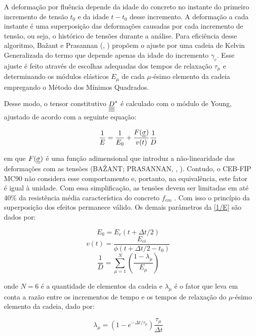 A deformação por fluência depende da idade do concreto no instante do primeiro incremento de tensão $t_0$ e da idade $t-t_0$ desse incremento. A deformação a cada instante é uma superposição das deformações causadas por cada incremento de tensão, ou seja, o histórico de tensões durante a análise. Para eficiência desse algoritmo, Ba\v{z}ant e Prasannan (\citeyear{BazantPrasannanA}, \citeyear{BazantPrasannanB}) propõem o ajuste por uma cadeia de Kelvin Generalizada do termo que depende apenas da idade do incremento $\gamma_c$. Esse ajuste é feito através de escolhas adequadas dos tempos de relaxação $\tau_\mu$ e determinando os módulos elásticos $E_\mu$ de cada $\mu$-ésimo elemento da cadeia empregando o Método dos Mínimos Quadrados.

Desse modo, o tensor constitutivo $\underline{\underline{\underline{\underline D}}}^\ast$ é calculado com o módulo de Young, ajustado de acordo com a seguinte equação:

\begin{equation}
\label{1/E}
\dfrac{1}{E} = \dfrac{1}{E_0}+\dfrac{F(\underline{\underline \sigma})}{v(t)}\dfrac{1}{D}
\end{equation}

em que $F(\underline{\underline \sigma})$ é uma função adimensional que introduz a não-linearidade das deformações com as tensões (BA\v{Z}ANT; PRASANNAN, \citeyear{BazantPrasannanA}, \citeyear{BazantPrasannanB}). Contudo, o CEB-FIP MC90 não considera esse comportamento e, portanto, na equivalência, este fator é igual à unidade. Com essa simplificação, as tensões devem ser limitadas em até 40\% da resistência média característica do concreto $f_{cm}$ \cite{CEB1993}. Com isso o princípio da superposição dos efeitos permanece válido. Os demais parâmetros da \autoref{1/E} são dados por:

\begin{equation}
E_0 = E_c(t+\Delta t/2)
\end{equation}
\begin{equation}
v(t) = \dfrac{E_{ci}}{\phi(t+\Delta t/2-t_0)} 
\end{equation}
\begin{equation}
\dfrac{1}{D} = \sum_{\mu = 1}^{N}\left(\dfrac{1-\lambda_\mu}{E_\mu}\right)
\end{equation}

onde $N = 6$ é a quantidade de elementos da cadeia e $\lambda_\mu$ é o fator que leva em conta a razão entre os incrementos de tempo e os tempos de relaxação do $\mu$-ésimo elemento da cadeia, dado por: 

\begin{equation}
\lambda_{\mu} = \left( 1-e^{-\Delta t/\tau_\mu}\right)\dfrac{\tau_\mu}{\Delta t}
\end{equation}

